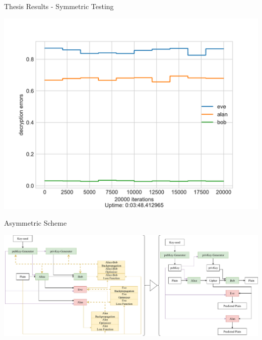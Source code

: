 \documentclass{beamer}
\begin{document}
		\begin{frame}{Thesis Results - Symmetric Testing}
			\begin{center}
				\includegraphics[height=0.9\textheight]{neurencoder-symmetric-testing}
			\end{center}
		\end{frame}
		\begin{frame}{Asymmetric Scheme}
			\begin{center}
				\includegraphics[width=\textwidth, height=0.8\textheight]{asymmtericScheme-present}
			\end{center}
		\end{frame}
\end{document}
